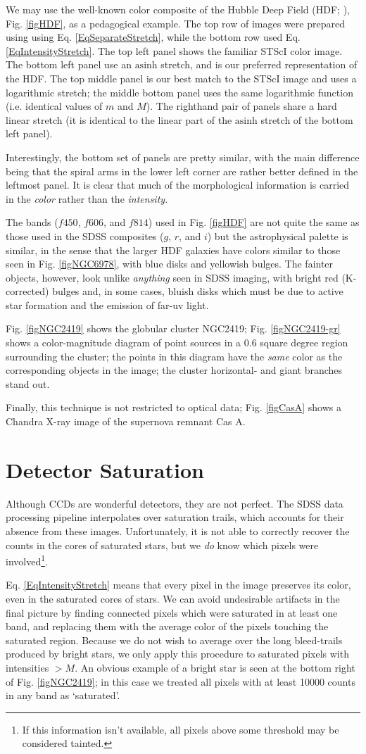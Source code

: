 \documentclass[preprint]{aastex}		%
\newcommand{\asinh}{\textrm{asinh}}
\newcommand{\HDFdescription}{%
The top row of images were prepared using using
Eq. \ref{EqSeparateStretch}, while the bottom row used
Eq. \ref{EqIntensityStretch}.  The top left panel shows the familiar
STScI color image. The bottom left panel use an $\asinh$ stretch, and
is our preferred representation of the HDF. The top middle panel is
our best match to the STScI image and uses a logarithmic stretch; the
middle bottom panel uses the same logarithmic function (i.e. identical
values of $m$ and $M$). The righthand pair of panels share a hard
linear stretch (it is identical to the linear part of the $\asinh$
stretch of the bottom left panel).}%
\begin{document}
We may use the well-known color composite of the Hubble Deep Field
(HDF; \cite{HDF}), Fig. \ref{figHDF}, as a pedagogical
example.
\HDFdescription

Interestingly, the bottom set of panels are pretty similar, with the
main difference being that the spiral arms in the lower left corner are
rather better defined in the leftmost panel. It is clear that much
of the morphological information is carried in the \emph{color}
rather than the \emph{intensity}.

The bands ($f450$, $f606$, and $f814$) used in Fig. \ref{figHDF} are
not quite the same as those used in the SDSS composites ($g$, $r$, and
$i$) but the astrophysical palette is similar, in the sense that the
larger HDF galaxies have colors similar to those seen in
Fig. \ref{figNGC6978}, with blue disks and yellowish bulges. The
fainter objects, however, look unlike \emph{anything} seen in SDSS
imaging, with bright red (K-corrected) bulges and, in some cases,
bluish disks which must be due to active star formation and the
emission of far-uv light.

Fig. \ref{figNGC2419} shows the globular cluster NGC2419;
Fig. \ref{figNGC2419-gr} shows a color-magnitude diagram of point
sources in a 0.6 square degree region surrounding the cluster; the
points in this diagram have the \emph{same} color as the corresponding
objects in the image; the cluster horizontal- and giant branches
stand out.

Finally, this technique is not restricted to optical data; Fig.
\ref{figCasA} shows a Chandra X-ray image of the supernova remnant Cas A.

\section{Detector Saturation}
\label{saturation}

Although CCDs are wonderful detectors, they are not perfect. The SDSS
data processing pipeline \citep{photo} interpolates over saturation
trails, which accounts for their absence from these images.
Unfortunately, it is not able to correctly recover the counts in the
cores of saturated stars, but we \emph{do} know which pixels were
involved\footnote{If this information isn't available, all pixels
  above some threshold may be considered tainted.}.

Eq. \ref{EqIntensityStretch} means that every pixel in the image
preserves its color, even in the saturated cores of stars. We can
avoid undesirable artifacts in the final picture by finding connected
pixels which were saturated in at least one band, and replacing them
with the average color of the pixels touching the saturated region.
Because we do not wish to average over the
long bleed-trails produced by bright stars, we only apply this
procedure to saturated pixels with intensities $> M$.
An obvious example of a bright star is seen at the bottom right of
Fig. \ref{figNGC2419}; in this case we treated all pixels
with at least 10000 counts in any band as `saturated'.
\end{document}

